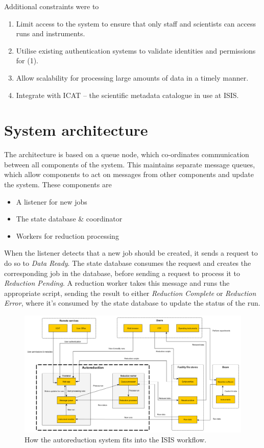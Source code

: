 \documentclass[twocolumn]{article}
\begin{document}
Additional constraints were to

\begin{enumerate}
\item
  Limit access to the system to ensure that only staff and scientists
  can access runs and instruments.
\item
  Utilise existing authentication systems to validate identities and
  permissions for (1).
\item
  Allow scalability for processing large amounts of data in a timely
  manner.
\item
  Integrate with ICAT\cite{icat} -- the scientific metadata catalogue in use
  at ISIS.
\end{enumerate}

\section{System architecture}\label{system-architecture}

The architecture is based on a queue node, which co-ordinates
communication between all components of the system. This maintains
separate message queues, which allow components to act on messages from
other components and update the system. These components are

\begin{itemize}[noitemsep]
\item
  A listener for new jobs
\item
  The state database \& coordinator
\item
  Workers for reduction processing
\end{itemize}

When the listener detects that a new job should be created, it sends a
request to do so to \emph{Data Ready}. The state database consumes the
request and creates the corresponding job in the database, before
sending a request to process it to \emph{Reduction Pending}. A reduction
worker takes this message and runs the appropriate script, sending the
result to either \emph{Reduction Complete} or \emph{Reduction Error},
where it's consumed by the state database to update the status of the
run.

\begin{figure}
\centering\includegraphics[width=1.15\linewidth,angle=90,origin=c]{system.png}
\caption{How the autoreduction system fits into the ISIS workflow.}
\end{figure}
\end{document}
